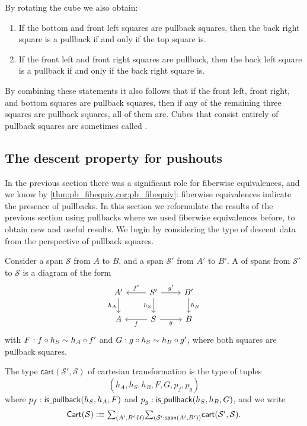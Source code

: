 \begin{rmk}
By rotating the cube we also obtain:
\begin{enumerate}
\item If the bottom and front left squares are pullback squares, then the back right square is a pullback if and only if the top square is.
\item If the front left and front right squares are pullback, then the back left square is a pullback if and only if the back right square is.
\end{enumerate}
By combining these statements it also follows that if the front left, front right, and bottom squares are pullback squares, then if any of the remaining three squares are pullback squares, all of them are. Cubes that consist entirely of pullback squares are sometimes called .
\end{rmk}

\subsection{The descent property for pushouts}

In the previous section there was a significant role for fiberwise equivalences, and we know by \cref{thm:pb_fibequiv,cor:pb_fibequiv}: fiberwise equivalences indicate the presence of pullbacks. In this section we reformulate the results of the previous section using pullbacks where we used fiberwise equivalences before, to obtain new and useful results. We begin by considering the type of descent data from the perspective of pullback squares.

\begin{defn}
Consider a span $\mathcal{S}$ from $A$ to $B$, and a span $\mathcal{S}'$ from $A'$ to $B'$. A of spans from $\mathcal{S}'$ to $\mathcal{S}$ is a diagram of the form
\begin{equation*}
\begin{tikzcd}
A' \arrow[d,swap,"h_A"]  & S' \arrow[l,swap,"{f'}"] \arrow[r,"{g'}"] \arrow[d,swap,"h_S"] & B' \arrow[d,"h_B"] \\
A & S \arrow[l,"f"] \arrow[r,swap,"g"] & B
\end{tikzcd}
\end{equation*}
with $F:f\circ h_S\sim h_A\circ f'$ and $G:g\circ h_S\sim h_B\circ g'$, where both squares are pullback squares. 

The type $\mathsf{cart}(\mathcal{S}',\mathcal{S})$ of cartesian transformation is the type of tuples
\begin{equation*}
(h_A,h_S,h_B,F,G,p_f,p_g)
\end{equation*}
where $p_f:\mathsf{is\underline{\ }{}pullback}(h_S,h_A,F)$ and $p_g:\mathsf{is\underline{\ }{}pullback}(h_S,h_B,G)$, and we write
\begin{equation*}
\mathsf{Cart}(\mathcal{S}) \defeq \sm{A',B':\UU}{\mathcal{S}':\mathsf{span}(A',B')}\mathsf{cart}(\mathcal{S}',\mathcal{S}).
\end{equation*}
\end{defn}

